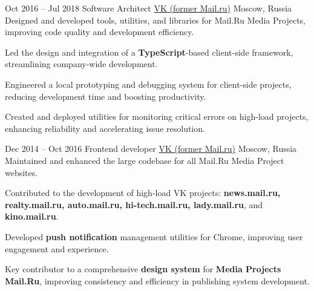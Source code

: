 \cventry
{Oct 2016 – Jul 2018}
{Software Architect}
{\href{https://vk.company}{VK ({former Mail.ru})}}
{Moscow, Russia}
{}
{Designed and developed tools, utilities, and libraries for Mail.Ru Media Projects, improving code quality and development efficiency.}

\cvlistitem
{Led the design and integration of a \textbf{TypeScript}-based client-side framework, streamlining company-wide development.}

\cvlistitem
{Engineered a local prototyping and debugging system for client-side projects, reducing development time and boosting productivity.}

\cvlistitem
{Created and deployed utilities for monitoring critical errors on high-load projects, enhancing reliability and accelerating issue resolution.}


\cventry
{Dec 2014 – Oct 2016}
{Frontend developer}
{\href{https://vk.company}{VK ({former Mail.ru})}}
{Moscow, Russia}
{}
{Maintained and enhanced the large codebase for all Mail.Ru Media Project websites.}

\cvlistitem
{Contributed to the development of high-load VK projects: \textbf{news.mail.ru, realty.mail.ru, auto.mail.ru, hi-tech.mail.ru, lady.mail.ru}, and \textbf{kino.mail.ru}.}

\cvlistitem
{Developed \textbf{push notification} management utilities for Chrome, improving user engagement and experience.}

\cvlistitem
{Key contributor to a comprehensive \textbf{design system} for \textbf{Media Projects Mail.Ru}, improving consistency and efficiency in publishing system development.}
